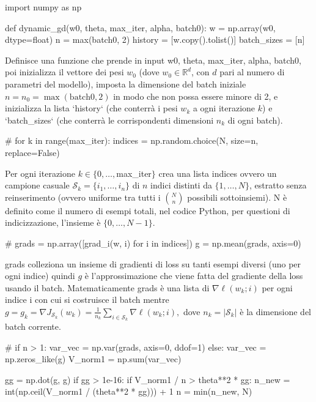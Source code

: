 \documentclass[a4paper,12pt]{article}
\begin{document}
\begin{pythoncode}[title= Dynamic GD]

import numpy as np

def dynamic_gd(w0, theta, max_iter, alpha, batch0):
    w = np.array(w0, dtype=float)
    n = max(batch0, 2)
    history     = [w.copy().tolist()]
    batch_sizes = [n]
\end{pythoncode}
Definisce una funzione che prende in input w0, theta, max\_iter, alpha, batch0, poi inizializza il vettore dei pesi $w_0$ (dove $w_0 \in \mathbb{R}^d$, con $d$ pari al numero di parametri del modello), imposta la dimensione del batch iniziale $n=n_0 = \max(\text{batch0}, 2)$ in modo che non possa essere minore di 2, e inizializza la lista `history` (che conterrà i pesi $w_k$ a ogni iterazione $k$) e `batch\_sizes` (che conterrà le corrispondenti dimensioni $n_k$ di ogni batch).
\begin{pythoncode}[title= Dynamic GD]

#
    for k in range(max_iter):
        indices = np.random.choice(N, size=n, replace=False)
\end{pythoncode}
Per ogni iterazione $k \in \{0,\dots,$max\_iter$\}$ crea una lista indices ovvero un campione casuale \(\mathcal{S}_k = \{i_1, \dots, i_n\}\) di \(n\) indici distinti da \(\{1,\dots,N\}\), estratto senza reinserimento (ovvero uniforme tra tutti i \(\binom{N}{n}\) possibili sottoinsiemi). N è definito come il numero di esempi totali, nel codice Python, per questioni di indicizzazione, l'insieme è \(\{0,\dots,N-1\}\).
\begin{pythoncode}[title= Dynamic GD]

#
        grads = np.array([grad_i(w, i) for i in indices])
        g = np.mean(grads, axis=0)
\end{pythoncode}
grads colleziona un insieme di gradienti di loss su tanti esempi diversi (uno per ogni indice) quindi $g$ è l'approssimazione che viene fatta del gradiente della loss usando il batch. Matematicamente grads è una lista di $\nabla \ell(w_k; i)$ per ogni indice i con cui si costruisce il batch mentre $g=g_k = \nabla J_{\mathcal{S}_k}(w_k) = \frac{1}{n_k} \sum_{i \in \mathcal{S}_k} \nabla \ell(w_k; i),$ dove \(n_k = |\mathcal{S}_k|\) è la dimensione del batch corrente.


\begin{pythoncode}[title= Dynamic GD]

#    
        if n > 1:
            var_vec = np.var(grads, axis=0, ddof=1)
        else:
            var_vec = np.zeros_like(g)
        V_norm1 = np.sum(var_vec)

        gg = np.dot(g, g)
        if gg > 1e-16:
            if V_norm1 / n > theta**2 * gg:
                n_new = int(np.ceil(V_norm1 / (theta**2 * gg))) + 1
                n = min(n_new, N)
\end{pythoncode}
\end{document}
